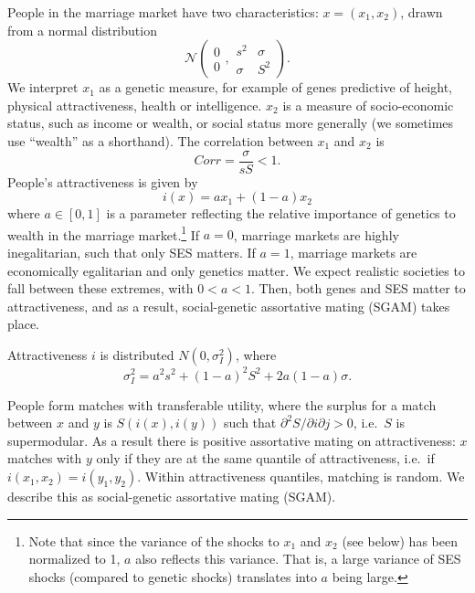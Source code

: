 \documentclass[
]{article}
\theoremstyle{definition}
\theoremstyle{definition}
\theoremstyle{definition}
\theoremstyle{definition}
\theoremstyle{remark}
\begin{document}
People in the marriage market have two characteristics:
\(x=\left( x_{1},x_{2}\right)\), drawn from a normal distribution
\[
\mathcal{N}
\left( 
\begin{array}{c}
0 \\ 
0%
\end{array}%
,%
\begin{array}{cc}
s^{2} & \sigma \\ 
\sigma & S^{2}%
\end{array}%
\right).
\]
We interpret \(x_1\) as a genetic measure, for example of genes predictive of
height, physical attractiveness, health or intelligence. \(x_2\) is a measure of
socio-economic status, such as income or wealth, or social status more generally
(we sometimes use ``wealth'' as a shorthand). The correlation between
\(x_1\) and \(x_2\) is
\[
Corr = \frac{\sigma }{sS} < 1.
\]
People's attractiveness is given by
\[
i\left( x\right) =ax_{1}+\left( 1-a\right) x_{2}
\]
where \(a \in [0, 1]\) is a parameter reflecting the relative importance of
genetics to wealth in the marriage market.\footnote{Note that since the variance of the shocks to \(x_1\) and \(x_2\)
  (see below) has been normalized to 1, \(a\) also reflects this variance. That
  is, a large variance of SES shocks (compared to genetic shocks) translates into
  \(a\) being large.} If \(a = 0\),
marriage markets are highly inegalitarian, such that only SES matters. If \(a = 1\), marriage markets are economically egalitarian and only genetics matter. We
expect realistic societies to fall between these extremes, with \(0 < a < 1\).
Then, both genes and SES matter to attractiveness, and as a result,
social-genetic assortative mating (SGAM) takes place.

Attractiveness \(i\) is
distributed \(N(0,\sigma_{I}^{2})\), where
\[
\sigma _{I}^{2}=a^{2}s^{2}+\left( 1-a\right) ^{2}S^{2}+2a\left( 1-a\right)\sigma.
\]

People form matches with transferable utility, where the surplus for a match
between \(x\) and \(y\) is \(S(i(x), i(y))\) such that \(\partial^{2}S/\partial i\partial j > 0\), i.e.~\(S\) is supermodular. As a result there is positive
assortative mating on attractiveness: \(x\) matches with \(y\) only if they are at
the same quantile of attractiveness, i.e.~if \(i(x_{1},x_{2}) = i(y_{1},y_{2})\).
Within attractiveness quantiles, matching is random. We describe this as
social-genetic assortative mating (SGAM).
\end{document}
